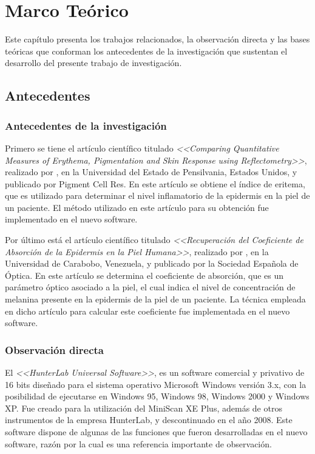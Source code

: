 \chapter{Marco Te\'{o}rico}

Este cap\'{i}tulo presenta los trabajos relacionados, la observaci\'{o}n directa y las bases te\'{o}ricas que conforman los antecedentes de la investigaci\'{o}n que sustentan el desarrollo del presente trabajo de investigaci\'{o}n.

	\section{Antecedentes}
	
		\subsection{Antecedentes de la investigaci\'{o}n}
			
			Primero se tiene el art\'{i}culo cient\'{i}fico titulado \textit{<<Comparing Quantitative Measures of Erythema, Pigmentation and Skin Response using Reflectometry>>}, realizado por \cite{Wagner}, en la Universidad del Estado de Pensilvania, Estados Unidos, y publicado por Pigment Cell Res. En este art\'{i}culo se obtiene el \'{i}ndice de eritema, que es utilizado para determinar el nivel inflamatorio de la epidermis en la piel de un paciente. El m\'{e}todo utilizado en este art\'{i}culo para su obtenci\'{o}n fue implementado en el nuevo software.
			
			Por	\'{u}ltimo est\'{a} el art\'{i}culo cient\'{i}fico titulado \textit{<<Recuperaci\'{o}n del Coeficiente de Absorci\'{o}n de la Epidermis en la Piel Humana>>}, realizado por \cite{Narea}, en la Universidad de Carabobo, Venezuela, y publicado por la Sociedad Espa\~{n}ola de \'{O}ptica. En este art\'{i}culo se determina el coeficiente de absorci\'{o}n, que es un par\'{a}metro \'{o}ptico asociado a la piel, el cual indica el nivel de concentraci\'{o}n de melanina presente en la epidermis de la piel de un paciente. La t\'{e}cnica empleada en dicho art\'{i}culo para calcular este coeficiente fue implementada en el nuevo software.

	\subsection{Observaci\'{o}n directa}
		
			El \textit{<<HunterLab Universal Software>>}, es un software comercial y privativo de 16 bits dise\~{n}ado para el sistema operativo Microsoft Windows versi\'{o}n 3.x, con la posibilidad de ejecutarse en Windows 95, Windows 98, Windows 2000 y Windows XP. Fue creado para la utilizaci\'{o}n del MiniScan XE Plus, adem\'{a}s de otros instrumentos de la empresa HunterLab, y descontinuado en el a\~{n}o 2008. Este software dispone de algunas de las funciones que fueron desarrolladas en el nuevo software, raz\'{o}n por la cual es una referencia importante de observaci\'{o}n.


